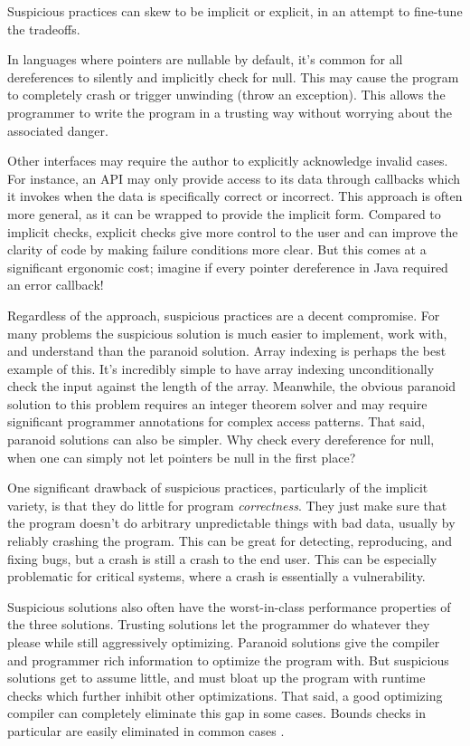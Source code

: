Suspicious practices can skew to be implicit or explicit, in an
attempt to fine-tune the tradeoffs.

In languages where pointers are nullable by default, it's common for all dereferences
to silently and implicitly check for null. This may cause the program to completely
crash or trigger unwinding (throw an exception). This allows the programmer
to write the program in a trusting way without worrying about the associated danger.

Other interfaces may require the author to explicitly acknowledge invalid cases.
For instance, an API may only provide access to its data through callbacks which it
invokes when the data is specifically correct or incorrect. This approach is often
more general, as it can be wrapped to provide the implicit form. Compared to
implicit checks, explicit checks give more control to the user and can improve the
clarity of code by making failure conditions more clear. But this comes at
a significant ergonomic cost; imagine if every pointer dereference in Java
required an error callback!

Regardless of the approach, suspicious practices are a decent compromise. For
many problems the suspicious solution is much easier to implement, work with,
and understand than the paranoid solution. Array indexing is perhaps the best
example of this. It's incredibly simple to have array indexing unconditionally
check the input against the length of the array. Meanwhile, the obvious paranoid
solution to this problem requires an integer theorem solver and may require
significant programmer annotations for complex access patterns. That said,
paranoid solutions can also be simpler. Why check every dereference for
null, when one can simply not let pointers be null in the first place?

One significant drawback of suspicious practices, particularly of the implicit
variety, is that they do little for program \emph{correctness}. They just make sure
that the program doesn't do arbitrary unpredictable things with bad data, usually by
reliably crashing the program. This can be great for detecting, reproducing,
and fixing bugs, but a crash is still a crash to the end user. This can be
especially problematic for critical systems, where a crash is essentially a
vulnerability.

Suspicious solutions also often have the worst-in-class performance properties
of the three solutions. Trusting solutions let the programmer do whatever they
please while still aggressively optimizing. Paranoid solutions give the
compiler and programmer rich information to optimize the program with.
But suspicious solutions get to assume little, and must bloat up
the program with runtime checks which further inhibit other optimizations.
That said, a good optimizing compiler can completely eliminate this gap in
some cases. Bounds checks in particular are easily eliminated in common cases
\cite{grosser2011polly}.




